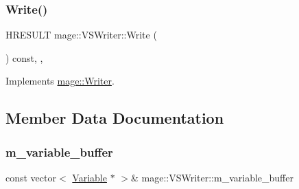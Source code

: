 \subsubsection{\texorpdfstring{Write()}{Write()}}
{\footnotesize\ttfamily H\+R\+E\+S\+U\+LT mage\+::\+V\+S\+Writer\+::\+Write (\begin{DoxyParamCaption}{ }\end{DoxyParamCaption}) const\hspace{0.3cm}{\ttfamily [override]}, {\ttfamily [protected]}, {\ttfamily [virtual]}}



Implements \hyperlink{classmage_1_1_writer_a674375dbb233dea030603212d4090c18}{mage\+::\+Writer}.



\subsection{Member Data Documentation}
\hypertarget{classmage_1_1_v_s_writer_a4fa655fa7c7d09a9439a22061ceab0f4}{}\label{classmage_1_1_v_s_writer_a4fa655fa7c7d09a9439a22061ceab0f4} 
\subsubsection{\texorpdfstring{m\+\_\+variable\+\_\+buffer}{m\_variable\_buffer}}
{\footnotesize\ttfamily const vector$<$ \hyperlink{structmage_1_1_variable}{Variable} $\ast$ $>$\& mage\+::\+V\+S\+Writer\+::m\+\_\+variable\+\_\+buffer\hspace{0.3cm}{\ttfamily [private]}}

